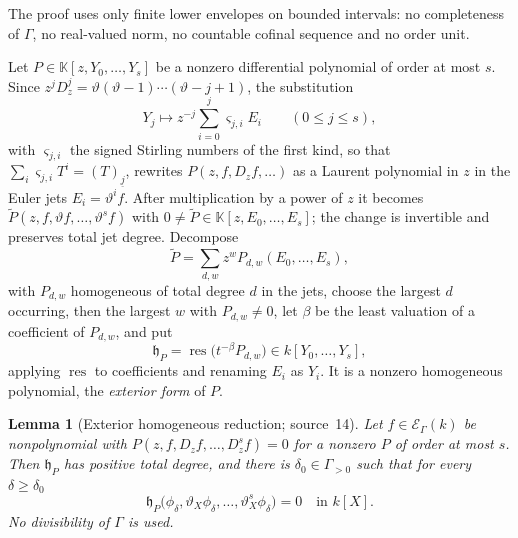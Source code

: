 \documentclass[11pt]{article}
\numberwithin{equation}{section}
\newtheorem{lemma}[theorem]{Lemma}
\theoremstyle{definition}
\theoremstyle{remark}
\newcommand{\res}{\operatorname{res}}
\newcommand{\fall}[2]{(#1)_{\underline{#2}}}
\newcommand{\KK}{\mathbb K}
\newcommand{\EK}{\mathcal E_\Gamma(k)}
\begin{document}
The proof uses only finite lower envelopes on bounded intervals: no
completeness of $\Gamma$, no real-valued norm, no countable cofinal sequence
and no order unit.

Let $P\in\KK[z,Y_0,\ldots,Y_s]$ be a nonzero differential polynomial of order
at most $s$. Since $z^jD_z^j=\vartheta(\vartheta-1)\cdots(\vartheta-j+1)$, the
substitution
\begin{equation}\label{hol:ot:eq:stirling}
 Y_j\longmapsto z^{-j}\sum_{i=0}^j\varsigma_{j,i}E_i\qquad(0\le j\le s),
\end{equation}
with $\varsigma_{j,i}$ the signed Stirling numbers of the first kind, so that
$\sum_i\varsigma_{j,i}T^i=\fall Tj$, rewrites $P(z,f,D_zf,\ldots)$ as a Laurent
polynomial in $z$ in the Euler jets $E_i=\vartheta^if$. After multiplication by
a power of $z$ it becomes $\widetilde P(z,f,\vartheta f,\ldots,\vartheta^sf)$
with $0\ne\widetilde P\in\KK[z,E_0,\ldots,E_s]$; the change is invertible and
preserves total jet degree. Decompose
\[
 \widetilde P=\sum_{d,w}z^wP_{d,w}(E_0,\ldots,E_s),
\]
with $P_{d,w}$ homogeneous of total degree $d$ in the jets, choose the largest
$d$ occurring, then the largest $w$ with $P_{d,w}\ne0$, let $\beta$ be the
least valuation of a coefficient of $P_{d,w}$, and put
\begin{equation}\label{hol:ot:eq:exterior}
 \mathfrak h_P=\res\bigl(t^{-\beta}P_{d,w}\bigr)\in k[Y_0,\ldots,Y_s],
\end{equation}
applying $\res$ to coefficients and renaming $E_i$ as $Y_i$. It is a nonzero
homogeneous polynomial, the \emph{exterior form} of $P$.

\begin{lemma}[Exterior homogeneous reduction; source~14]
\label{hol:ot:lem:exterior}
Let $f\in\EK$ be nonpolynomial with $P(z,f,D_zf,\ldots,D_z^sf)=0$ for a nonzero
$P$ of order at most $s$. Then $\mathfrak h_P$ has positive total degree, and
there is $\delta_0\in\Gamma_{>0}$ such that for every $\delta\ge\delta_0$
\[
 \mathfrak h_P\bigl(\phi_\delta,\vartheta_X\phi_\delta,\ldots,
 \vartheta_X^s\phi_\delta\bigr)=0\quad\text{in }k[X].
\]
No divisibility of $\Gamma$ is used.
\end{lemma}
\end{document}
